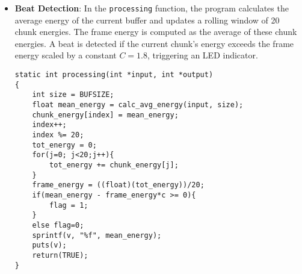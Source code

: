 \documentclass{article}
\begin{document}
\begin{itemize}
    \item \textbf{Beat Detection}: In the \texttt{processing} function, the program calculates the average energy of the current buffer and updates a rolling window of 20 chunk energies. The frame energy is computed as the average of these chunk energies. A beat is detected if the current chunk's energy exceeds the frame energy scaled by a constant $C=1.8$, triggering an LED indicator.
    \begin{lstlisting}[caption={Beat Detection Code in volume.c},label={lst:beat}]
static int processing(int *input, int *output)
{
    int size = BUFSIZE;
    float mean_energy = calc_avg_energy(input, size);
    chunk_energy[index] = mean_energy;
    index++;
    index %= 20;
    tot_energy = 0;
    for(j=0; j<20;j++){
        tot_energy += chunk_energy[j];
    }
    frame_energy = ((float)(tot_energy))/20;
    if(mean_energy - frame_energy*c >= 0){
        flag = 1;
    }
    else flag=0;
    sprintf(v, "%f", mean_energy);
    puts(v);
    return(TRUE);
}
    \end{lstlisting}
\end{itemize}

% 
\end{document}
